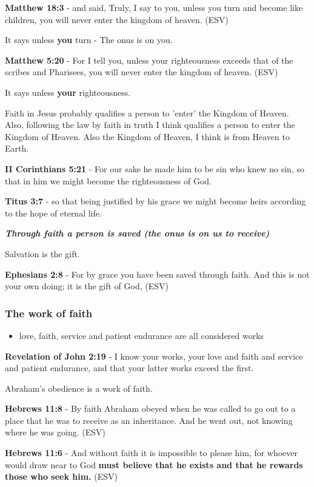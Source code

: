 \documentclass[11pt]{article}
\begin{document}
\textbf{Matthew 18:3} -  and said, Truly, I say to you, unless you turn and become like children, you will never enter the kingdom of heaven.  (ESV)

It says unless \textbf{you} turn - The onus is on you.

\textbf{Matthew 5:20} - For I tell you, unless your righteousness exceeds that of the scribes and Pharisees, you will never enter the kingdom of heaven. (ESV)

It says unless \textbf{your} righteousness.

Faith in Jesus probably qualifies a person to 'enter' the Kingdom of Heaven.
Also, following the law by faith in truth I think qualifies a person to enter the Kingdom of Heaven.
Also the Kingdom of Heaven, I think is from Heaven to Earth.

\textbf{II Corinthians 5:21} - For our sake he made him to be sin who knew no sin, so that in him we might become the righteousness of God.

\textbf{Titus 3:7} - so that being justified by his grace we might become heirs according to the hope of eternal life.

\emph{\textbf{Through faith a person is saved (the onus is on us to receive)}}

Salvation is the gift.

\textbf{Ephesians 2:8} - For by grace you have been saved through faith.  And this is not your own doing; it is the gift of God,  (ESV)

\subsubsection{The work of faith}
\label{sec:org9563e66}
\begin{itemize}
\item love, faith, service and patient endurance are all considered works
\end{itemize}

\textbf{Revelation of John 2:19} - I know your works, your love and faith and service and patient endurance, and that your latter works exceed the first.

Abraham's obedience is a work of faith.

\textbf{Hebrews 11:8} - By faith Abraham obeyed when he was called to go out to a place that he was to receive as an inheritance. And he went out, not knowing where he was going. (ESV)

\textbf{Hebrews 11:6} - And without faith it is impossible to please him, for whoever would draw near to God \textbf{must believe that he exists and that he rewards those who seek him.} (ESV)
\end{document}
